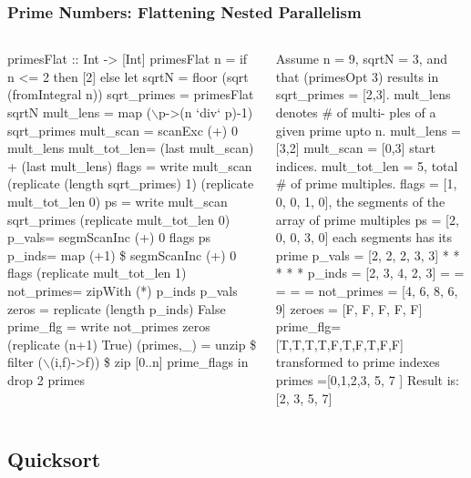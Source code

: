 \documentclass{beamer}
\newcommand{\mymath}[1]{$ #1 $}
\begin{document}
\begin{frame}[fragile,t]
  \frametitle{Prime Numbers: Flattening Nested Parallelism}
\vspace{-2ex}
\begin{columns}
\begin{colorcode}[fontsize=\scriptsize]
primesFlat :: Int -> [Int]
primesFlat n = if n <= 2 then [2] else 
 let sqrtN = floor (sqrt (fromIntegral n))
     sqrt_primes = primesFlat sqrtN
     mult_lens   = map (\mymath{\backslash}p->(n `div` p)-1) 
                   sqrt_primes
     mult_scan   = scanExc (+) 0 mult_lens 
     mult_tot_len= (last mult_scan) + 
                   (last mult_lens)
     flags = write mult_scan 
          (replicate (length sqrt_primes) 1) 
          (replicate mult_tot_len 0)
     ps    = write mult_scan sqrt_primes              
                  (replicate mult_tot_len 0)
     p_vals= segmScanInc (+) 0 flags ps
     p_inds= map (+1) \$ segmScanInc (+) 0 flags 
                  (replicate mult_tot_len 1)
     not_primes= zipWith (*) p_inds p_vals
     zeros = replicate (length p_inds) False 
     prime_flg  = write not_primes zeros 
                  (replicate (n+1) True)
     (primes,_) = unzip \$ filter (\mymath{\backslash}(i,f)->f)) 
                    \$ zip [0..n] prime_flags
 in drop 2 primes
\end{colorcode}
\begin{colorcode}[fontsize=\scriptsize]
Assume n = 9, sqrtN = 3, and 
that (primesOpt 3) results in 
sqrt_primes = [2,3].
mult_lens denotes \# of multi-
  ples of a given prime upto n.
mult_lens = [3,2]
mult_scan = [0,3] start indices.
mult_tot_len = 5, total \# of 
  prime multiples.
flags      = [1, 0, 0, 1, 0],
  the segments of the array
        of prime multiples
ps         = [2, 0, 0, 3, 0]
  each segments has its prime
p_vals     = [2, 2, 2, 3, 3]
              *  *  *  *  *
p_inds     = [2, 3, 4, 2, 3]
              =  =  =  =  =
not_primes = [4, 6, 8, 6, 9]
zeroes     = [F, F, F, F, F]
prime_flg=[T,T,T,T,F,T,F,T,F,F]
  transformed to prime indexes
primes   =[0,1,2,3,  5,  7    ]
\alert{Result is: [2, 3, 5, 7]}
\end{colorcode}
\end{columns}
\medskip

\end{frame}

\subsection{Quicksort}
\end{document}
